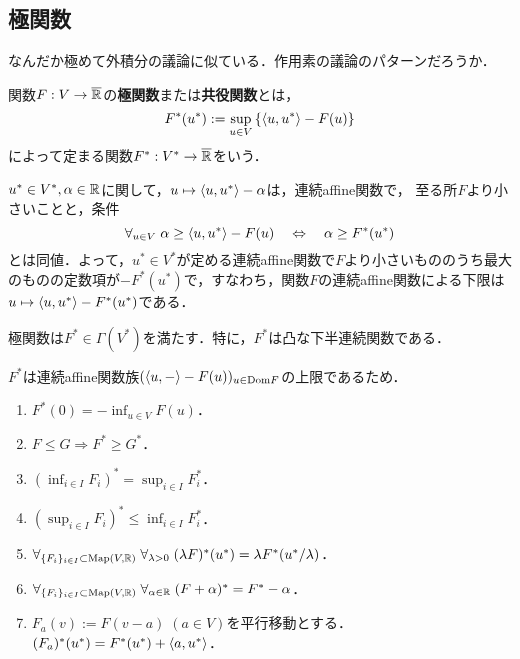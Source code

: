 \documentclass[uplatex,dvipdfmx]{jsreport}
\begin{document}
\subsection{極関数}

\begin{tcolorbox}[colframe=ForestGreen, colback=ForestGreen!10!white,breakable,colbacktitle=ForestGreen!40!white,coltitle=black,fonttitle=\bfseries\sffamily,
title=]
    なんだか極めて外積分の議論に似ている．作用素の議論のパターンだろうか．
\end{tcolorbox}

\begin{definition}
    関数$F:V\to\overline{\mathbb{R}}$の\textbf{極関数}または\textbf{共役関数}とは，
    \[F^*(u^*):=\sup_{u\in V}\left\{\langle u,u^*\rangle-F(u)\right\}\]
    によって定まる関数$F^*:V^*\to\overline{\mathbb{R}}$をいう．
\end{definition}
\begin{remarks}
    $u^*\in V^*,\alpha\in\mathbb{R}$に関して，$u\mapsto\langle u,u^*\rangle-\alpha$は，連続affine関数で，
    至る所$F$より小さいことと，条件
    \[\forall_{u\in V}\;\alpha\ge\langle u,u^*\rangle-F(u)\quad\Leftrightarrow\quad\alpha\ge F^*(u^*)\]
    とは同値．よって，$u^*\in V^*$が定める連続affine関数で$F$より小さいもののうち最大のものの定数項が$-F^*(u^*)$で，すなわち，関数$F$の連続affine関数による下限は$u\mapsto\langle u,u^*\rangle-F^*(u^*)$である．
\end{remarks}

\begin{lemma}
    極関数は$F^*\in\Gamma(V^*)$を満たす．特に，$F^*$は凸な下半連続関数である．
\end{lemma}
\begin{Proof}
    $F^*$は連続affine関数族$(\langle u,-\rangle-F(u))_{u\in\mathrm{Dom} F}$の上限であるため．
\end{Proof}

\begin{corollary}\mbox{}
    \begin{enumerate}
        \item $F^*(0)=-\inf_{u\in V}F(u)$．
        \item $F\le G\Rightarrow F^*\ge G^*$．
        \item $(\inf_{i\in I}F_i)^*=\sup_{i\in I}F^*_i$．
        \item $(\sup_{i\in I}F_i)^*\le\inf_{i\in I}F^*_i$．
        \item $\forall_{\{F_i\}_{i\in I}\subset\mathrm{Map}(V,\mathbb{R})}\;\forall_{\lambda>0}\;(\lambda F)^*(u^*)=\lambda F^*(u^*/\lambda)$．
        \item $\forall_{\{F_i\}_{i\in I}\subset\mathrm{Map}(V,\mathbb{R})}\;\forall_{\alpha\in\mathbb{R}}\;(F+\alpha)^*=F^*-\alpha$．
        \item $F_a(v):=F(v-a)\;(a\in V)$を平行移動とする．$(F_a)^*(u^*)=F^*(u^*)+\langle a,u^*\rangle$．
    \end{enumerate}
\end{corollary}
\end{document}
